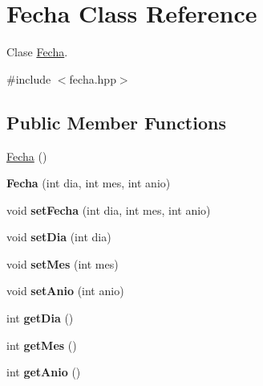 \hypertarget{classFecha}{}\section{Fecha Class Reference}
\label{classFecha}


Clase \hyperlink{classFecha}{Fecha}.  




{\ttfamily \#include $<$fecha.\+hpp$>$}

\subsection*{Public Member Functions}
\begin{DoxyCompactItemize}
\item 
\hyperlink{classFecha_a5fbc6564d9c48e73cf8d27568a2a7fc5}{Fecha} ()
\item 
\hypertarget{classFecha_a754b69179942caff9d4f914c62aab353}{}{\bfseries Fecha} (int dia, int mes, int anio)\label{classFecha_a754b69179942caff9d4f914c62aab353}

\item 
\hypertarget{classFecha_ad52d31c4293ebd24b3fb8b47710b5789}{}void {\bfseries set\+Fecha} (int dia, int mes, int anio)\label{classFecha_ad52d31c4293ebd24b3fb8b47710b5789}

\item 
\hypertarget{classFecha_a274c19166fdc6169ae02247b06372aa4}{}void {\bfseries set\+Dia} (int dia)\label{classFecha_a274c19166fdc6169ae02247b06372aa4}

\item 
\hypertarget{classFecha_a889235a87ea75cb02373e894d8e4c660}{}void {\bfseries set\+Mes} (int mes)\label{classFecha_a889235a87ea75cb02373e894d8e4c660}

\item 
\hypertarget{classFecha_a3cfbea8834e7a23023f11c3d069838f0}{}void {\bfseries set\+Anio} (int anio)\label{classFecha_a3cfbea8834e7a23023f11c3d069838f0}

\item 
\hypertarget{classFecha_a9f8e09d5e11a3bf9e4c234e8cd2c004a}{}int {\bfseries get\+Dia} ()\label{classFecha_a9f8e09d5e11a3bf9e4c234e8cd2c004a}

\item 
\hypertarget{classFecha_aa501ddd9a46effadac3f08c89140d9ac}{}int {\bfseries get\+Mes} ()\label{classFecha_aa501ddd9a46effadac3f08c89140d9ac}

\item 
\hypertarget{classFecha_a89ebafe74bc6e5f53ad688dce1d3fc26}{}int {\bfseries get\+Anio} ()\label{classFecha_a89ebafe74bc6e5f53ad688dce1d3fc26}

\end{DoxyCompactItemize}


